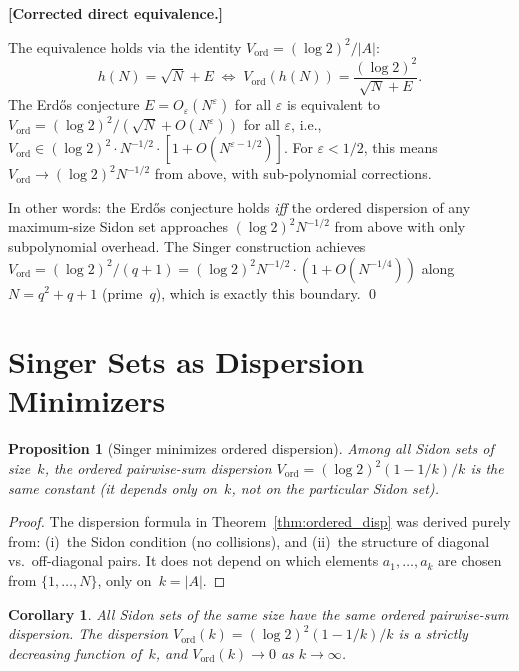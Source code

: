 \documentclass[11pt]{amsart}
\theoremstyle{plain}
\newtheorem{corollary}[theorem]{Corollary}
\newtheorem{proposition}[theorem]{Proposition}
\theoremstyle{definition}
\theoremstyle{remark}
\begin{document}
\textbf{[Corrected direct equivalence.]}

The equivalence holds via the identity $V_{\mathrm{ord}} = (\log 2)^2/|A|$:
\[
  h(N) = \sqrt{N} + E \;\Longleftrightarrow\; V_{\mathrm{ord}}(h(N)) = \frac{(\log 2)^2}{\sqrt{N}+E}.
\]
The Erd\H{o}s conjecture $E = O_\varepsilon(N^\varepsilon)$ for all $\varepsilon$ is
equivalent to $V_{\mathrm{ord}} = (\log 2)^2/(\sqrt{N} + O(N^\varepsilon))$
for all $\varepsilon$, i.e., $V_{\mathrm{ord}} \in (\log 2)^2 \cdot N^{-1/2} \cdot
[1 + O(N^{\varepsilon-1/2})]$. For $\varepsilon < 1/2$, this means $V_{\mathrm{ord}}
\to (\log 2)^2 N^{-1/2}$ from above, with sub-polynomial corrections.

In other words: the Erd\H{o}s conjecture holds \emph{iff} the ordered
dispersion of any maximum-size Sidon set approaches $(\log 2)^2 N^{-1/2}$
from above with only subpolynomial overhead. The Singer construction
achieves $V_{\mathrm{ord}} = (\log 2)^2/(q+1) = (\log 2)^2 N^{-1/2}
\cdot (1 + O(N^{-1/4}))$ along $N = q^2+q+1$ (prime~$q$), which is exactly
this boundary.
\hfill\qed

\section{Singer Sets as Dispersion Minimizers}

\begin{proposition}[Singer minimizes ordered dispersion]\label{prop:singer_min}
Among all Sidon sets of size~$k$, the ordered pairwise-sum dispersion
$V_{\mathrm{ord}} = (\log 2)^2(1-1/k)/k$ is \emph{the same constant}
(it depends only on~$k$, not on the particular Sidon set).
\end{proposition}

\begin{proof}
The dispersion formula in Theorem~\ref{thm:ordered_disp} was derived
purely from: (i)~the Sidon condition (no collisions), and (ii)~the
structure of diagonal vs.\ off-diagonal pairs.  It does not depend on
which elements $a_1,\ldots,a_k$ are chosen from $\{1,\ldots,N\}$, only
on~$k = |A|$.
\end{proof}

\begin{corollary}
All Sidon sets of the same size have the same ordered pairwise-sum
dispersion.  The dispersion $V_{\mathrm{ord}}(k) = (\log 2)^2(1-1/k)/k$
is a strictly decreasing function of~$k$, and
$V_{\mathrm{ord}}(k) \to 0$ as $k \to \infty$.
\end{corollary}
\end{document}
